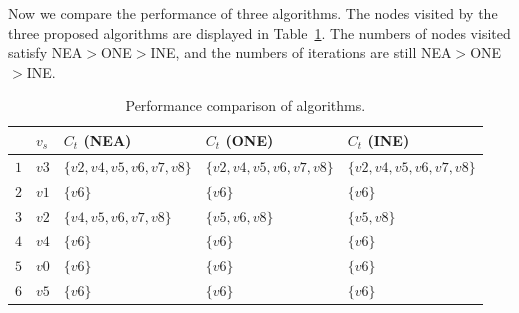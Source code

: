 Now we compare the performance of three algorithms. The nodes visited by the three proposed algorithms are displayed in Table~\ref{tab:algocomp}.
The numbers of nodes visited satisfy NEA$>$ONE$>$INE, and the numbers of iterations are still NEA$>$ONE$>$INE.
\begin{table}[htbp]
	\centering
	\caption{Performance comparison of algorithms.}
	\begin{tabular}{|l|l|l|l|l|}
    \hline
     & $v_s$ & $C_t$ (NEA) & $C_t$ (ONE) & $C_t$ (INE)  \\
    \hline
    $1$ & $v3$   & $\{v2,v4,v5,v6,v7,v8\}$	  & $\{v2,v4,v5,v6,v7,v8\}$	& $\{v2,v4,v5,v6,v7,v8\}$	 \\
    $2$ & $v1$   & $\{v6\}$	 &  $\{v6\}$	&  $\{v6\}$ \\
     $3$ & $v2$   & $\{v4,v5,v6,v7,v8\}$	 & $\{v5,v6,v8\}$& $\{v5,v8\}$	 \\
     $4$ & $v4$   & $\{v6\}$	 & $\{v6\}$	& $\{v6\}$	 \\
      $5$ & $v0$   & $\{v6\}$	 & $\{v6\}$	& $\{v6\}$ \\
     $6$ & $v5$   & $\{v6\}$	 & $\{v6\}$	& $\{v6\}$ \\
    \hline
    \end{tabular}
    \label{tab:algocomp}
\end{table}

